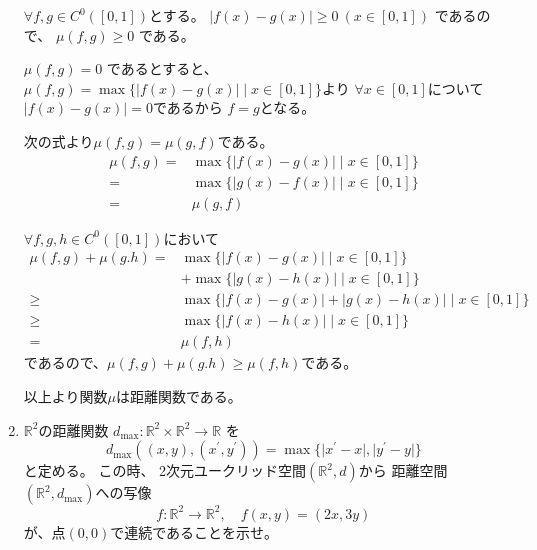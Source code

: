 \documentclass[12pt,b5paper]{ltjsarticle}
\begin{document}
\begin{enumerate}
      \dotfill

      $\forall f,g \in C^0([0,1])$とする。
      $\lvert f(x) - g(x) \rvert \geq 0 \ (x\in[0,1])$
      であるので、
      $\mu(f,g)\geq 0$ である。

      $\mu(f,g)= 0$ であるとすると、
      $\mu(f,g) = \max \{ \lvert f(x) - g(x) \rvert \mid x\in[0,1] \}$より
      $\forall x\in[0,1]$について$\lvert f(x)-g(x)\rvert =0$であるから
      $f=g$となる。

      次の式より$\mu(f,g)=\mu(g,f)$である。
      \begin{align}
       \mu(f,g) =& \max \{ \lvert f(x) - g(x) \rvert \mid x\in[0,1] \}\\
       =& \max \{ \lvert g(x) - f(x) \rvert \mid x\in[0,1] \}\\
       =& \mu(g,f)
      \end{align}

      $\forall f,g,h\in C^0([0,1])$において
      \begin{align}
       \mu(f,g)+\mu(g.h)
       =& \max \{ \lvert f(x) - g(x) \rvert \mid x\in[0,1] \}\\
       &  +\max \{ \lvert g(x) - h(x) \rvert \mid x\in[0,1] \}\\
       \geq & \max \{ \lvert f(x) - g(x) \rvert + \lvert g(x) - h(x) \rvert \mid x\in[0,1] \}\\
       \geq &\max \{ \lvert f(x) - h(x) \rvert \mid x\in[0,1] \}\\
       =& \mu(f,h)
      \end{align}
      であるので、$\mu(f,g)+\mu(g.h) \geq \mu(f,h)$である。

      以上より関数$\mu$は距離関数である。

      \hrulefill

 \item

      $\mathbb{R}^2$の距離関数
      $d_{\max}:\mathbb{R}^2 \times \mathbb{R}^2 \rightarrow \mathbb{R}$
      を
     \begin{equation}
      d_{\max} ( (x,y),(x^\prime,y^\prime))
       = \max\{ \lvert x^\prime -x \rvert , \lvert y^\prime -y \rvert \}
     \end{equation}
      と定める。
      この時、
      2次元ユークリッド空間$(\mathbb{R}^2 , d)$から
      距離空間$(\mathbb{R}^2 , d_{\max})$への写像
     \begin{equation}
      f : \mathbb{R}^2 \rightarrow \mathbb{R}^2,
       \quad f(x,y)=(2x,3y)
     \end{equation}
      が、点$(0,0)$で連続であることを示せ。


\end{enumerate}
\end{document}
